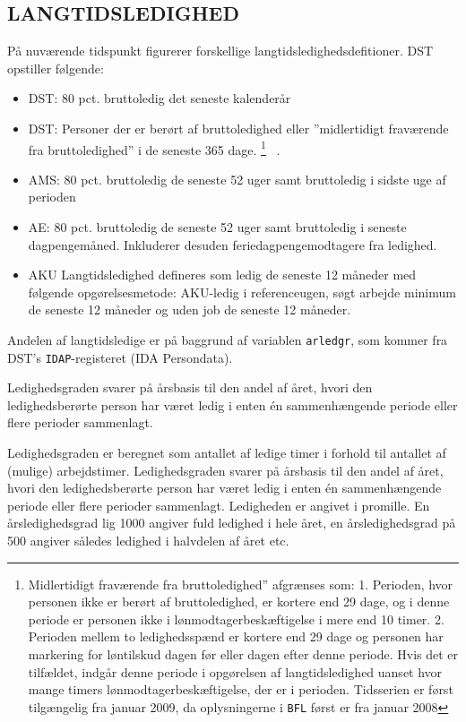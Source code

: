\subsection{LANGTIDSLEDIGHED \label{}}
%
På nuværende tidspunkt figurerer forskellige langtidsledighedsdefitioner. DST \parencite{Grunnet-Lauridsen2014} opstiller følgende: 
\begin{itemize} [topsep=6pt,itemsep=-1ex]
  \item DST: 80 pct. bruttoledig det seneste kalenderår
  \item DST: Personer der er berørt af bruttoledighed eller ”midlertidigt fraværende fra bruttoledighed” i de seneste 365 dage.%
%
\footnote{Midlertidigt fraværende fra bruttoledighed” afgrænses som: 1. Perioden, hvor personen ikke er berørt af bruttoledighed, er kortere end 29 dage, og i denne periode er personen ikke i lønmodtagerbeskæftigelse i mere end 10 timer. 2. Perioden mellem to ledighedsspænd er kortere end 29 dage og personen har markering for løntilskud dagen før eller dagen efter denne periode. Hvis det er tilfældet, indgår denne periode i opgørelsen af langtidsledighed uanset hvor mange timers lønmodtagerbeskæftigelse, der er i perioden. Tidsserien er først tilgængelig fra januar 2009, da oplysningerne i \texttt{BFL} først er fra januar 2008}%
%
\ .
  \item AMS: 80 pct. bruttoledig de seneste 52 uger samt bruttoledig i sidste uge af perioden
  \item AE: 80 pct. bruttoledig de seneste 52 uger samt bruttoledig i seneste dagpengemåned. Inkluderer desuden feriedagpengemodtagere fra ledighed.
  \item AKU Langtidsledighed defineres som ledig de seneste 12 måneder med følgende opgørelsesmetode: AKU-ledig i referenceugen, søgt arbejde minimum de seneste 12 måneder og uden job de seneste 12 måneder.
\end{itemize}
%

Andelen af langtidsledige er på baggrund af variablen \texttt{arledgr}, som kommer fra DST's \texttt{IDAP}-registeret (IDA Persondata).

Ledighedsgraden svarer på årsbasis til den andel af året, hvori den ledighedsberørte person har været ledig i enten én sammenhængende periode eller flere perioder sammenlagt.

Ledighedsgraden er beregnet som antallet af ledige timer i forhold til antallet af (mulige) arbejdstimer. Ledighedsgraden svarer på årsbasis til den andel af året, hvori den ledighedsberørte person har været ledig i enten én sammenhængende periode eller flere perioder sammenlagt. Ledigheden er angivet i promille. En årsledighedsgrad lig 1000 angiver fuld ledighed i hele året, en årsledighedsgrad på 500 angiver således ledighed i halvdelen af året etc.

